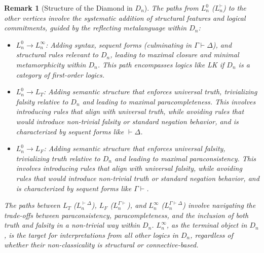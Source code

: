 \documentclass{article}
\newtheorem{remark}{Remark}[section] %
\newcommand{\LT}{L_T} %
\newcommand{\LF}{L_F} %
\begin{document}
\begin{remark}[Structure of the Diamond in $D_n$]
																																																																														The paths from $L^0_n$ ($L^{\vdash}_n$) to the other vertices involve the systematic addition of structural features and logical commitments, guided by the reflecting metalanguage within $D_n$:
																																																																														\begin{itemize}
																																																																															\item $L^0_n \to L^\infty_n$: Adding syntax, sequent forms (culminating in $\Gamma \vdash \Delta$), and structural rules relevant to $D_n$, leading to maximal closure and minimal metamorphicity within $D_n$. This path encompasses logics like LK if $D_n$ is a category of first-order logics.
																																																																															\item $L^0_n \to \LT$: Adding semantic structure that enforces universal truth, trivializing falsity relative to $D_n$ and leading to maximal paracompleteness. This involves introducing rules that align with universal truth, while avoiding rules that would introduce non-trivial falsity or standard negation behavior, and is characterized by sequent forms like $\vdash \Delta$.
																																																																															\item $L^0_n \to \LF$: Adding semantic structure that enforces universal falsity, trivializing truth relative to $D_n$ and leading to maximal paraconsistency. This involves introducing rules that align with universal falsity, while avoiding rules that would introduce non-trivial truth or standard negation behavior, and is characterized by sequent forms like $\Gamma \vdash$.
																																																																															\end{itemize}
																																																																																The paths between $\LT$ ($L^{\vdash\Delta}_n$), $\LF$ ($L^{\Gamma\vdash}_n$), and $L^\infty_n$ ($L^{\Gamma\vdash\Delta}_n$) involve navigating the trade-offs between paraconsistency, paracompleteness, and the inclusion of both truth and falsity in a non-trivial way within $D_n$. $L^\infty_n$, as the terminal object in $D_n$, is the target for interpretations from all other logics in $D_n$, regardless of whether their non-classicality is structural or connective-based.
																																																																																\end{remark}
																																																																																	
\end{document}
